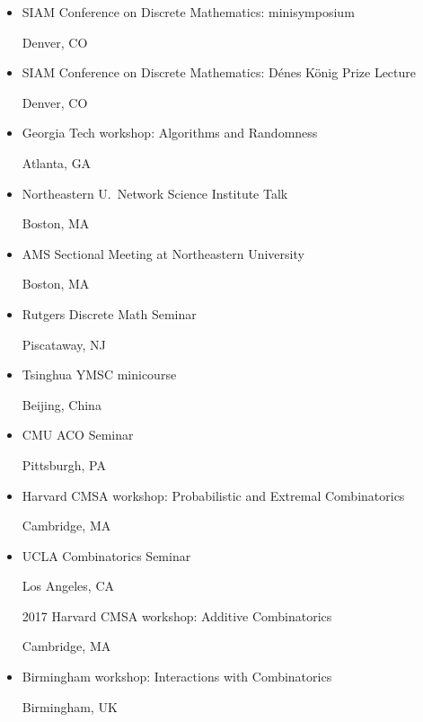 \documentclass[11pt]{amsart}
\newcommand{\rightloc}[1]{\hfill {\raggedright #1}}
\begin{document}
\begin{itemize}[leftmargin=.4in,itemsep=5pt,topsep=0pt,label={}]
\item SIAM Conference on Discrete Mathematics: minisymposium \rightloc{Denver, CO}

\item SIAM Conference on Discrete Mathematics: D\'enes K\"onig Prize Lecture \rightloc{Denver, CO}

\item Georgia Tech workshop: Algorithms and Randomness \rightloc{Atlanta, GA}

\item Northeastern U.\ Network Science Institute Talk \rightloc{Boston, MA}

\item AMS Sectional Meeting at Northeastern University \rightloc{Boston, MA}

\item Rutgers Discrete Math Seminar \rightloc{Piscataway, NJ}

\item Tsinghua YMSC minicourse \rightloc{Beijing, China}

\item CMU ACO Seminar \rightloc{Pittsburgh, PA}

\item Harvard CMSA workshop: Probabilistic and Extremal Combinatorics \rightloc{Cambridge, MA}

\item UCLA Combinatorics Seminar \rightloc{Los Angeles, CA}

\item[2017] Harvard CMSA workshop: Additive Combinatorics \rightloc{Cambridge, MA}

\item Birmingham workshop: Interactions with Combinatorics \rightloc{Birmingham, UK}


\end{itemize}
\end{document}
